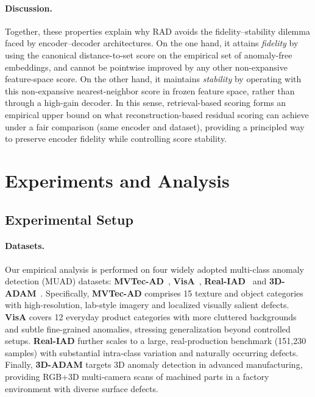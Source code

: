 \documentclass{article}
\theoremstyle{plain}
\theoremstyle{definition}
\theoremstyle{remark}
\begin{document}
\paragraph{Discussion.}
Together, these properties explain why RAD avoids the fidelity--stability
dilemma faced by encoder--decoder architectures.
On the one hand, it attains \emph{fidelity} by using the canonical distance-to-set score on the empirical set of anomaly-free embeddings, %
and cannot be pointwise improved by any other non-expansive feature-space score.
On the other hand, it maintains \emph{stability} by operating with this non-expansive nearest-neighbor score in frozen feature space, rather than through a high-gain decoder.
In this sense, retrieval-based scoring forms an empirical upper bound on what reconstruction-based residual scoring can achieve under a fair comparison (same encoder and dataset), providing a principled way to preserve encoder fidelity while controlling score stability.

\section{Experiments and Analysis}\label{sec:exp&analysis}
\subsection{Experimental Setup}
\paragraph{Datasets.} Our empirical analysis is performed on four widely adopted multi-class anomaly detection (MUAD) datasets: \textbf{MVTec-AD}~\cite{bergmann2019mvtec}, \textbf{VisA}~\cite{zou2022spot}, \textbf{Real-IAD}~\cite{wang2024real} and \textbf{3D-ADAM}~\cite{mchard20253d}. 
Specifically, \textbf{MVTec-AD} comprises 15 texture and object categories with high-resolution, lab-style imagery and localized visually salient defects. \textbf{VisA} covers 12 everyday product categories with more cluttered backgrounds and subtle fine-grained anomalies, stressing generalization beyond controlled setups. \textbf{Real-IAD} further scales to a large, real-production benchmark (151,230 samples) with substantial intra-class variation and naturally occurring defects. Finally, \textbf{3D-ADAM} targets 3D anomaly detection in advanced manufacturing, providing RGB+3D multi-camera scans of machined parts in a factory environment with diverse surface defects.
\end{document}
